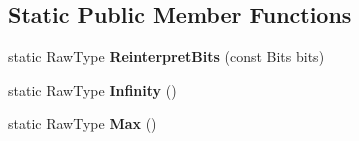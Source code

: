 \subsection*{Static Public Member Functions}
\begin{DoxyCompactItemize}
\item 
static Raw\+Type {\bfseries Reinterpret\+Bits} (const Bits bits)\hypertarget{classtesting_1_1internal_1_1FloatingPoint_ac551f793522e54fbd8a25acb79eac5b1}{}\label{classtesting_1_1internal_1_1FloatingPoint_ac551f793522e54fbd8a25acb79eac5b1}

\item 
static Raw\+Type {\bfseries Infinity} ()\hypertarget{classtesting_1_1internal_1_1FloatingPoint_a460027cc19cf01ae8e09cc3796b2b575}{}\label{classtesting_1_1internal_1_1FloatingPoint_a460027cc19cf01ae8e09cc3796b2b575}

\item 
static Raw\+Type {\bfseries Max} ()\hypertarget{classtesting_1_1internal_1_1FloatingPoint_aae5954d8a57d3ff0987c6930cb68e114}{}\label{classtesting_1_1internal_1_1FloatingPoint_aae5954d8a57d3ff0987c6930cb68e114}

\end{DoxyCompactItemize}
